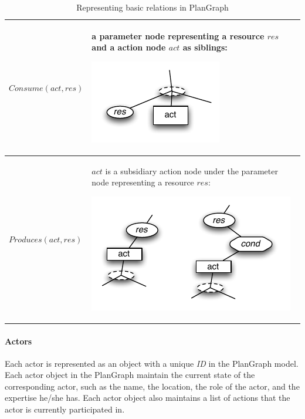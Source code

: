 \begin{table}[htbp]
\begin{tabular}{>{\raggedright}p{1.5in}>{\raggedright}p{4in}}
\midrule 
$Consume(act, res)$ & a parameter node representing a resource $res$ and  a action node $act$ as siblings: 
\par \includegraphics{consumes.pdf}\tabularnewline
\midrule 
$Produces(act, res)$ &  $act$ is a subsidiary action node under the parameter node representing a resource $res$: 
\par \includegraphics{produces.pdf}\tabularnewline
\bottomrule

\end{tabular}	
\caption{Representing basic relations in PlanGraph}
\label{tab:basic_rel_pg}
\end{table}

\paragraph*{Actors} %
\label{par:actors_in_plangraph}
Each actor is represented as an object with a unique \emph{ID} in the PlanGraph model. Each actor object in the PlanGraph maintain the current state of the corresponding actor, such as the name, the location, the role of the actor, and the expertise he/she has. Each actor object also maintains a list of actions that the actor is currently participated in.

